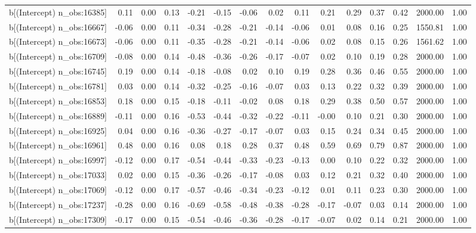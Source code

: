 \begin{table}[ht]
\begin{tabular}{rrrrrrrrrrrrrrr}
  b[(Intercept) n\_obs:16385] & 0.11 & 0.00 & 0.13 & -0.21 & -0.15 & -0.06 & 0.02 & 0.11 & 0.21 & 0.29 & 0.37 & 0.42 & 2000.00 & 1.00 \\ 
  b[(Intercept) n\_obs:16667] & -0.06 & 0.00 & 0.11 & -0.34 & -0.28 & -0.21 & -0.14 & -0.06 & 0.01 & 0.08 & 0.16 & 0.25 & 1550.81 & 1.00 \\ 
  b[(Intercept) n\_obs:16673] & -0.06 & 0.00 & 0.11 & -0.35 & -0.28 & -0.21 & -0.14 & -0.06 & 0.02 & 0.08 & 0.15 & 0.26 & 1561.62 & 1.00 \\ 
  b[(Intercept) n\_obs:16709] & -0.08 & 0.00 & 0.14 & -0.48 & -0.36 & -0.26 & -0.17 & -0.07 & 0.02 & 0.10 & 0.19 & 0.28 & 2000.00 & 1.00 \\ 
  b[(Intercept) n\_obs:16745] & 0.19 & 0.00 & 0.14 & -0.18 & -0.08 & 0.02 & 0.10 & 0.19 & 0.28 & 0.36 & 0.46 & 0.55 & 2000.00 & 1.00 \\ 
  b[(Intercept) n\_obs:16781] & 0.03 & 0.00 & 0.14 & -0.32 & -0.25 & -0.16 & -0.07 & 0.03 & 0.13 & 0.22 & 0.32 & 0.39 & 2000.00 & 1.00 \\ 
  b[(Intercept) n\_obs:16853] & 0.18 & 0.00 & 0.15 & -0.18 & -0.11 & -0.02 & 0.08 & 0.18 & 0.29 & 0.38 & 0.50 & 0.57 & 2000.00 & 1.00 \\ 
  b[(Intercept) n\_obs:16889] & -0.11 & 0.00 & 0.16 & -0.53 & -0.44 & -0.32 & -0.22 & -0.11 & -0.00 & 0.10 & 0.21 & 0.30 & 2000.00 & 1.00 \\ 
  b[(Intercept) n\_obs:16925] & 0.04 & 0.00 & 0.16 & -0.36 & -0.27 & -0.17 & -0.07 & 0.03 & 0.15 & 0.24 & 0.34 & 0.45 & 2000.00 & 1.00 \\ 
  b[(Intercept) n\_obs:16961] & 0.48 & 0.00 & 0.16 & 0.08 & 0.18 & 0.28 & 0.37 & 0.48 & 0.59 & 0.69 & 0.79 & 0.87 & 2000.00 & 1.00 \\ 
  b[(Intercept) n\_obs:16997] & -0.12 & 0.00 & 0.17 & -0.54 & -0.44 & -0.33 & -0.23 & -0.13 & 0.00 & 0.10 & 0.22 & 0.32 & 2000.00 & 1.00 \\ 
  b[(Intercept) n\_obs:17033] & 0.02 & 0.00 & 0.15 & -0.36 & -0.26 & -0.17 & -0.08 & 0.03 & 0.12 & 0.21 & 0.32 & 0.40 & 2000.00 & 1.00 \\ 
  b[(Intercept) n\_obs:17069] & -0.12 & 0.00 & 0.17 & -0.57 & -0.46 & -0.34 & -0.23 & -0.12 & 0.01 & 0.11 & 0.23 & 0.30 & 2000.00 & 1.00 \\ 
  b[(Intercept) n\_obs:17237] & -0.28 & 0.00 & 0.16 & -0.69 & -0.58 & -0.48 & -0.38 & -0.28 & -0.17 & -0.07 & 0.03 & 0.14 & 2000.00 & 1.00 \\ 
  b[(Intercept) n\_obs:17309] & -0.17 & 0.00 & 0.15 & -0.54 & -0.46 & -0.36 & -0.28 & -0.17 & -0.07 & 0.02 & 0.14 & 0.21 & 2000.00 & 1.00 \\ 

\end{tabular}
\end{table}
